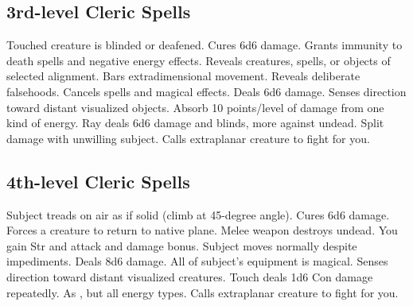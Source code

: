 \subsection{3rd-level Cleric Spells}
\begin{spelllist}
   Touched creature is blinded or deafened.
   Cures 6d6 damage.
   Grants immunity to death spells and negative energy effects.
   Reveals creatures, spells, or objects of selected alignment.
   Bars extradimensional movement.
   Reveals deliberate falsehoods.
   Cancels spells and magical effects.
   Deals 6d6 damage.
   Senses direction toward distant visualized objects.
   Absorb 10 points/level of damage from one kind of energy.
   Ray deals 6d6 damage and blinds, more against undead.
    Split damage with unwilling subject.
   Calls extraplanar creature to fight for you.
\end{spelllist}

\subsection{4th-level Cleric Spells}
\begin{spelllist}
   Subject treads on air as if solid (climb at 45-degree angle).
   Cures 6d6 damage.
   Forces a creature to return to native plane.
   Melee weapon destroys undead.
   You gain  Str and attack and damage bonus.
   Subject moves normally despite impediments.
   Deals 8d6 damage.
   All of subject's equipment is magical.
   Senses direction toward distant visualized creatures.
   Touch deals 1d6 Con damage repeatedly.
   As , but all energy types.
   Calls extraplanar creature to fight for you.
\end{spelllist}


